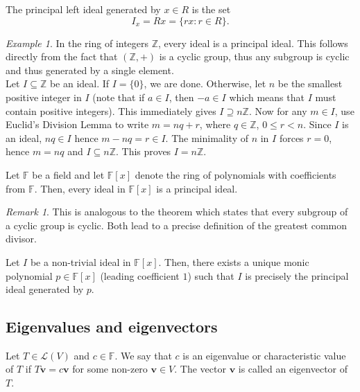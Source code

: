 \documentclass[11pt]{article}
\newcommand{\Z}{\mathbb{Z}}
\newcommand{\F}{\mathbb{F}}
\renewcommand{\vec}[1]{\boldsymbol{#1}}
\newcommand{\vv}{\vec{v}}
\newcommand{\alg}[1]{\mathscr{#1}}
\newcommand{\algL}{\alg{L}}
\theoremstyle{definition}
\theoremstyle{remark}
\newtheorem*{remark}{Remark}
\newtheorem*{example}{Example}
\numberwithin{equation}{section}
\begin{document}
    \begin{definition}
        The principal left ideal generated by $x \in R$ is the set \[
            I_x = Rx = \{rx: r \in R\}.
        \] 
    \end{definition}
    \begin{example}
        In the ring of integers $\Z$, every ideal is a principal ideal. This follows
        directly from the fact that $(\Z, +)$ is a cyclic group, thus any subgroup is
        cyclic and thus generated by a single element. \\

        Let $I \subseteq \Z$ be an ideal. If $I = \{0\}$, we are done. Otherwise, let
        $n$ be the smallest positive integer in $I$ (note that if $a \in I$, then $-a
        \in I$ which means that $I$ must contain positive integers). This immediately
        gives $I \supseteq n\Z$. Now for any $m \in I$, use Euclid's Division Lemma
        to write $m = nq + r$, where $q \in \Z$, $0 \leq r < n$. Since $I$ is an
        ideal, $nq \in I$ hence $m - nq = r \in I$.  The minimality of $n$ in $I$
        forces $r = 0$, hence $m = nq$ and $I \subseteq n\Z$. This proves $I = n\Z$.
    \end{example}

    \begin{theorem}
        Let $\F$ be a field and let $\F[x]$ denote the ring of polynomials with
        coefficients from $\F$. Then, every ideal in $\F[x]$ is a principal ideal.
        \begin{remark}
            This is analogous to the theorem which states that every subgroup of a
            cyclic group is cyclic. Both lead to a precise definition of the greatest
            common divisor.
        \end{remark}
    \end{theorem}
    \begin{corollary}
        Let $I$ be a non-trivial ideal in $\F[x]$. Then, there exists a unique monic
        polynomial $p \in \F[x]$ (leading coefficient $1$) such that $I$ is precisely
        the principal ideal generated by $p$.
    \end{corollary}

    \subsection{Eigenvalues and eigenvectors}
    \begin{definition}
        Let $T \in \algL(V)$ and $c \in \F$. We say that $c$ is an eigenvalue or
        characteristic value of $T$ if $T\vv = c\vv$ for some non-zero $\vv \in V$.
        The vector $\vv$ is called an eigenvector of $T$.
    \end{definition}
\end{document}
